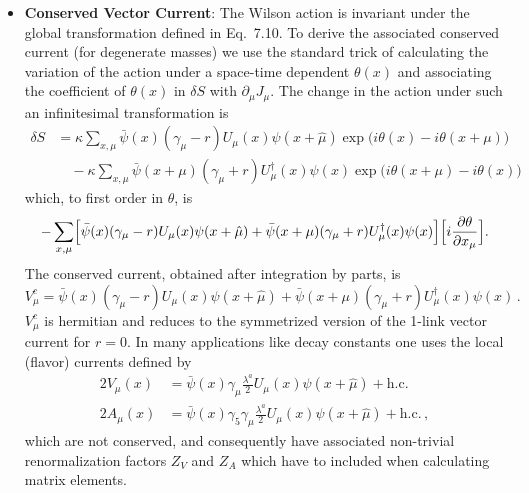 \begin{itemize}
\item \textbf{Conserved Vector Current}: The Wilson action is invariant under
the global transformation defined in Eq.~7.10.  To derive the associated
conserved current (for degenerate masses) we use the standard trick of
calculating the variation of the action under a space-time dependent
$\theta(x)$ and associating the coefficient of $\theta(x)$ in $\delta S$ with
$\partial_\mu J_\mu$.  The change in the action under such an infinitesimal
transformation is
\begin{align*}
\delta S &= \kappa \sum_{x,\mu} \bar\psi(x)(\gamma_\mu - r) U_\mu(x) \psi(x + \hat{\mu}) \exp\bigl( i\theta(x) - i\theta(x + \mu) \bigr) \\
&\quad - \kappa \sum_{x,\mu} \bar\psi(x + \mu)(\gamma_\mu + r) U_\mu^\dagger (x) \psi(x) \exp\bigl( i\theta(x + \mu) - i\theta(x) \bigr)
\end{align*}
which, to first order in $\theta$, is
\[
-\sum_{x,\mu} \Bigl[ \bar\psi(x)(\gamma_\mu - r) U_\mu(x) \psi(x + \hat{\mu}) + \bar\psi(x + \mu)(\gamma_\mu + r) U_\mu^\dagger (x) \psi(x) \Bigr] \Bigl[ i \frac{\partial \theta}{\partial x_\mu} \Bigr] .
\]
The conserved current, obtained after integration by parts, is
\begin{equation}
V^{c}_\mu = \bar\psi(x) (\gamma_\mu - r) U_\mu (x) \psi (x + \hat{\mu}) + \bar\psi(x + \mu)(\gamma_\mu + r) U_\mu^\dagger (x) \psi (x) \,.
\end{equation}
$V^{c}_\mu$ is hermitian and reduces to the symmetrized version of the 1-link
vector current for $r = 0$.  In many applications like decay constants one uses
the local (flavor) currents defined by
\begin{align}
2V_\mu(x) &= \bar\psi(x) \gamma_\mu \frac{\lambda^a}{2} U_\mu (x) \psi (x + \hat{\mu}) + \mathrm{h.c.} \nonumber\\
2A_\mu(x) &= \bar\psi(x) \gamma_5\gamma_\mu \frac{\lambda^a}{2} U_\mu (x) \psi (x + \hat{\mu}) + \mathrm{h.c.} \,,
\end{align}
which are not conserved, and consequently have associated non-trivial
renormalization factors $Z_V$ and $Z_A$ which have to included when calculating
matrix elements.


\end{itemize}
